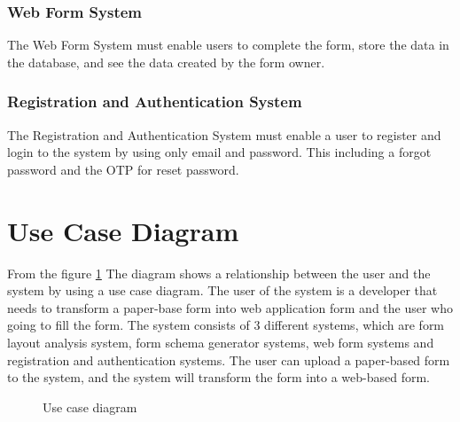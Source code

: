 \documentclass[12pt,oneside,openright,a4paper]{cpe-english-project}
\begin{document}
\subsubsection{Web Form System}

The Web Form System must enable users to complete the form, store the data in the database, and see the data created by the form owner.

\subsubsection{Registration and Authentication System}

The Registration and Authentication System must enable a user to register and login to the system by using only email and password. This including a forgot password and the  OTP for reset password.

\section{Use Case Diagram}

From the figure \ref{fig:use-case} The diagram shows a relationship between the user and the system by using a use case diagram. The user of the system is a developer that needs to transform a paper-base form into web application form and the user who going to fill the form. The system consists of 3 different systems, which are form layout analysis system, form schema generator systems, web form systems and registration and authentication systems. The user can upload a paper-based form to the system, and the system will transform the form into a web-based form.

\begin{figure}[!h]
\centering
{}
\caption{Use case diagram}\label{fig:use-case}
\end{figure}
\end{document}
